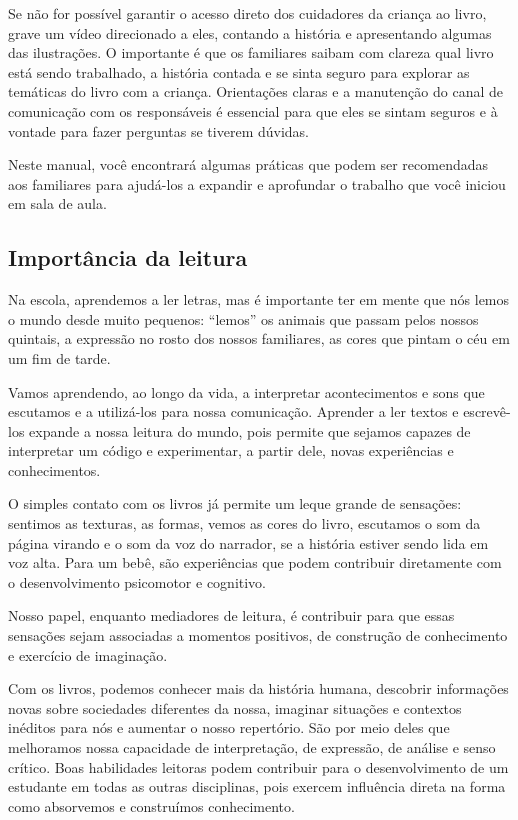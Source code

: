 \documentclass[11pt]{extarticle}
\begin{document}
{{Se não for possível garantir o acesso direto dos cuidadores da criança ao livro, 
grave um vídeo direcionado a eles, contando a história e apresentando algumas 
das ilustrações. O importante é que os familiares saibam com clareza qual livro 
está sendo trabalhado, a história contada e se sinta seguro para explorar as temáticas 
do livro com a criança. Orientações claras e a manutenção do canal de comunicação com 
os responsáveis é essencial para que eles se sintam seguros e à vontade para fazer perguntas 
se tiverem dúvidas. 

Neste manual, você encontrará algumas práticas que podem ser 
recomendadas aos familiares para ajudá-los a expandir e aprofundar o trabalho 
que você iniciou em sala de aula.


\subsection{Importância da leitura}
Na escola, aprendemos a ler letras, mas é importante ter em mente que nós 
lemos o mundo desde muito pequenos: “lemos” os animais que passam pelos nossos 
quintais, a expressão no rosto dos nossos familiares, as cores que pintam o céu 
em um fim de tarde. 

Vamos aprendendo, ao longo da vida, a interpretar acontecimentos 
e sons que escutamos e a utilizá-los para nossa comunicação. Aprender a ler textos e 
escrevê-los expande a nossa leitura do mundo, pois permite que sejamos capazes de 
interpretar um código e experimentar, a partir dele, novas experiências e conhecimentos. 

O simples contato com os livros já permite um leque grande de sensações: 
sentimos as texturas, as formas, vemos as cores do livro, escutamos o som da página 
virando e o som da voz do narrador, se a história estiver sendo lida em voz alta. Para um 
bebê, são experiências que podem contribuir diretamente com o desenvolvimento psicomotor 
e cognitivo. 

Nosso papel, enquanto mediadores de leitura, é contribuir para que essas 
sensações sejam associadas a momentos positivos, de construção de 
conhecimento e exercício de imaginação. 

Com os livros, podemos conhecer mais da história humana, descobrir informações 
novas sobre sociedades diferentes da nossa, imaginar situações e contextos inéditos 
para nós e aumentar o nosso repertório. São por meio deles que melhoramos nossa 
capacidade de interpretação, de expressão, de análise e senso crítico. Boas habilidades 
leitoras podem contribuir para o desenvolvimento de um estudante em todas as outras 
disciplinas, pois exercem influência direta na forma como absorvemos e 
construímos conhecimento.


}}
\end{document}
